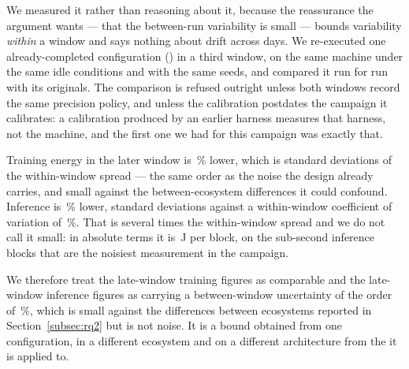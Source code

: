 We measured it rather than reasoning about it, because the reassurance the
argument wants --- that the between-run variability is small --- bounds
variability \emph{within} a window and says nothing about drift across days. We
re-executed one already-completed configuration (\vCalibConfig) in a third
window, on the same machine under the same idle conditions and with the same
seeds, and compared it run for run with its originals. The comparison is refused
outright unless both windows record the same precision policy, and unless the
calibration postdates the campaign it calibrates: a calibration produced by an
earlier harness measures that harness, not the machine, and the first one we had
for this campaign was exactly that.

Training energy in the later window is \vCalibTrainDiffPct\,\% lower, which is
\vCalibTrainSD{} standard deviations of the within-window spread --- the same
order as the noise the design already carries, and small against the
between-ecosystem differences it could confound. Inference is
\vCalibInferDiffPct\,\% lower, \vCalibInferSD{} standard deviations against a
within-window coefficient of variation of \vCalibInferCVPct\,\%. That is several
times the within-window spread and we do not call it small: in absolute terms it
is \vCalibInferDiffJ\,\si{\joule} per block, on the sub-second inference blocks
that are the noisiest measurement in the campaign.

We therefore treat the late-window training figures as comparable and the
late-window inference figures as carrying a between-window uncertainty of the
order of \vCalibInferDiffPct\,\%, which is small against the differences between
ecosystems reported in Section~\ref{subsec:rq2} but is not noise. It is a
bound obtained from one configuration, in a different ecosystem and on a
different architecture from the \vLateConfigurations{} it is applied to.


